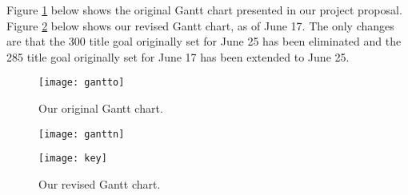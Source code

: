 \documentclass[11pt,english]{article}
\begin{document}
Figure \ref{fig:gantto} below shows the original Gantt chart presented in
our project proposal. Figure \ref{fig:ganttn} below shows our revised Gantt
chart, as of June 17. The only changes are that the 300 title goal originally
set for June 25 has been eliminated and the 285 title goal originally set for
June 17 has been extended to June 25.
\begin{figure}[h]
\begin{center}
\texttt{[image: gantto]}
\end{center}
\vspace{-0.7cm}
\caption{Our original Gantt chart.}
\label{fig:gantto}
\end{figure}
\begin{figure}[h]
\begin{center}
\texttt{[image: ganttn]}
\end{center}
\vspace{-0.7cm}
\caption{Our revised Gantt chart.}
\label{fig:ganttn}
\texttt{[image: key]}
\end{figure}
\end{document}
